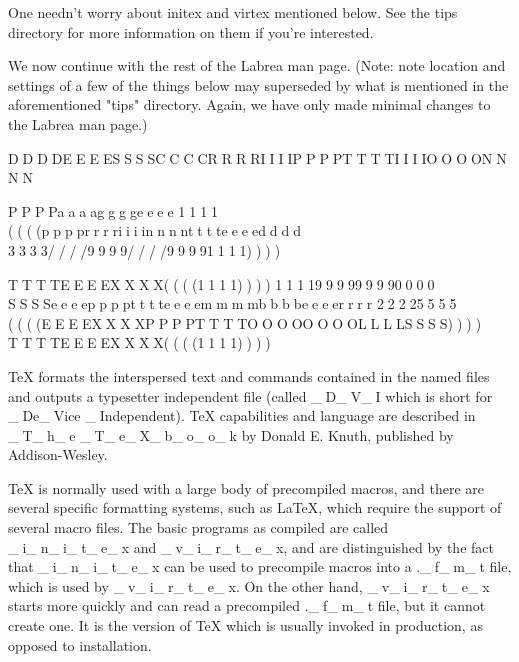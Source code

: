           One needn't worry about initex and virtex mentioned below.
          See the tips directory for more information on them if
          you're interested.

          We now continue with the rest of the Labrea man page.
          (Note: note location and settings of a few of the things
          below may superseded by what is mentioned in the
          aforementioned "tips" directory.  Again, we have only made
          minimal changes to the Labrea man page.)


     DDDDEEEESSSSCCCCRRRRIIIIPPPPTTTTIIIIOOOONNNN



     PPPPaaaaggggeeee 1111                                           ((((pppprrrriiiinnnntttteeeedddd 3333////9999////99991111))))






     TTTTEEEEXXXX((((1111))))            1111999999990000 SSSSeeeepppptttteeeemmmmbbbbeeeerrrr 22225555 ((((EEEEXXXXPPPPTTTTOOOOOOOOLLLLSSSS))))             TTTTEEEEXXXX((((1111))))



          TeX formats the interspersed text and commands contained in
          the named files and outputs a typesetter independent file
          (called _D_V_I which is short for _De_Vice _Independent).  TeX
          capabilities and language are described in _T_h_e _T_e_X_b_o_o_k by
          Donald E. Knuth, published by Addison-Wesley.

          TeX is normally used with a large body of precompiled
          macros, and there are several specific formatting systems,
          such as LaTeX, which require the support of several macro
          files.  The basic programs as compiled are called _i_n_i_t_e_x and
          _v_i_r_t_e_x, and are distinguished by the fact that _i_n_i_t_e_x can be
          used to precompile macros into a ._f_m_t file, which is used by
          _v_i_r_t_e_x.  On the other hand, _v_i_r_t_e_x starts more quickly and
          can read a precompiled ._f_m_t file, but it cannot create one.
          It is the version of TeX which is usually invoked in
          production, as opposed to installation.

